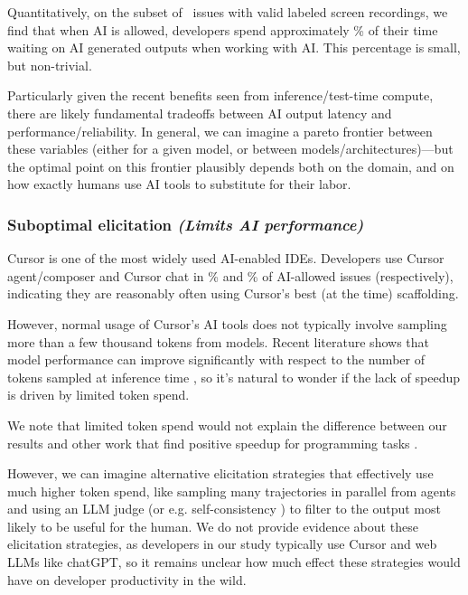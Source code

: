 \documentclass{article}
\begin{document}
Quantitatively, on the subset of \NumLoomVideosFilteredAIAllowed\ issues with valid labeled screen recordings, we find that when AI is allowed, developers spend approximately \PctWaitingOnAIAIAllowed\% of their time waiting on AI generated outputs when working with AI. This percentage is small, but non-trivial.

Particularly given the recent benefits seen from inference/test-time compute, there are likely fundamental tradeoffs between AI output latency and performance/reliability. In general, we can imagine a pareto frontier between these variables (either for a given model, or between models/architectures)---but the optimal point on this frontier plausibly depends both on the domain, and on how exactly humans use AI tools to substitute for their labor.


\subsubsection{Suboptimal elicitation \textnormal{\textit{(Limits AI performance)}}}
\label{sec:factor-suboptimal-elicitation}

Cursor is one of the most widely used AI-enabled IDEs. Developers use Cursor agent/composer and Cursor chat in \PctLoomWithUICursorAgentOrComposer\% and \PctLoomWithUICursorChat \% of AI-allowed issues (respectively), indicating they are reasonably often using Cursor's best (at the time) scaffolding.

However, normal usage of Cursor's AI tools does not typically involve sampling more than a few thousand tokens from models. Recent literature shows that model performance can improve significantly with respect to the number of tokens sampled at inference time \cite{snell2024scalingllmtesttimecompute}, so it’s natural to wonder if the lack of speedup is driven by limited token spend.

We note that limited token spend would not explain the difference between our results and other work that find positive speedup for programming tasks \cite{peng2023impactaideveloperproductivity, cui2025effectsgenerativeai}.

However, we can imagine alternative elicitation strategies that effectively use much higher token spend, like sampling many trajectories in parallel from agents and using an LLM judge (or e.g. self-consistency \cite{wang2023selfconsistencyimproveschainthought}) to filter to the output most likely to be useful for the human. We do not provide evidence about these elicitation strategies, as developers in our study typically use Cursor and web LLMs like chatGPT, so it remains unclear how much effect these strategies would have on developer productivity in the wild.
\end{document}
